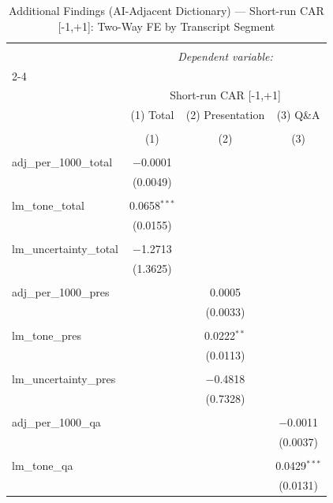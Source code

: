 
\begin{table}[!htbp] \centering 
  \caption{Additional Findings (AI-Adjacent Dictionary) — Short-run CAR [-1,+1]: Two-Way FE by Transcript Segment} 
  \label{} 
\begin{tabular}{@{\extracolsep{5pt}}lccc} 
\\[-1.8ex]\hline 
\hline \\[-1.8ex] 
 & \multicolumn{3}{c}{\textit{Dependent variable:}} \\ 
\cline{2-4} 
\\[-1.8ex] & \multicolumn{3}{c}{Short-run CAR [-1,+1]} \\ 
 & (1) Total & (2) Presentation & (3) Q\&A \\ 
\\[-1.8ex] & (1) & (2) & (3)\\ 
\hline \\[-1.8ex] 
 adj\_per\_1000\_total & $-$0.0001 &  &  \\ 
  & (0.0049) &  &  \\ 
  & & & \\ 
 lm\_tone\_total & 0.0658$^{***}$ &  &  \\ 
  & (0.0155) &  &  \\ 
  & & & \\ 
 lm\_uncertainty\_total & $-$1.2713 &  &  \\ 
  & (1.3625) &  &  \\ 
  & & & \\ 
 adj\_per\_1000\_pres &  & 0.0005 &  \\ 
  &  & (0.0033) &  \\ 
  & & & \\ 
 lm\_tone\_pres &  & 0.0222$^{**}$ &  \\ 
  &  & (0.0113) &  \\ 
  & & & \\ 
 lm\_uncertainty\_pres &  & $-$0.4818 &  \\ 
  &  & (0.7328) &  \\ 
  & & & \\ 
 adj\_per\_1000\_qa &  &  & $-$0.0011 \\ 
  &  &  & (0.0037) \\ 
  & & & \\ 
 lm\_tone\_qa &  &  & 0.0429$^{***}$ \\ 
  &  &  & (0.0131) \\ 

\end{tabular}
\end{table}
